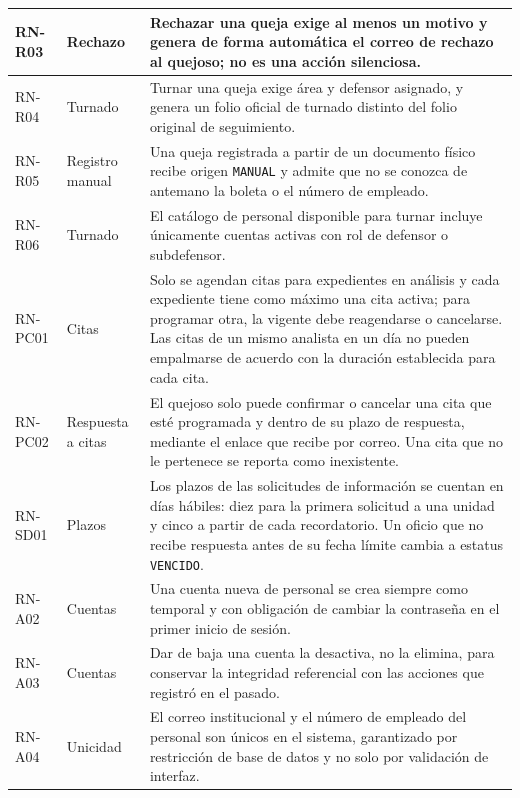 \begin{longtable}{|L{1.8cm}|L{2.7cm}|L{11.1cm}|}
	
		RN-R03 & Rechazo & Rechazar una queja exige al menos un motivo y genera de forma automática
		el correo de rechazo al quejoso; no es una acción silenciosa. \\ \hline
	
		RN-R04 & Turnado & Turnar una queja exige área y defensor asignado, y genera un folio oficial
		de turnado distinto del folio original de seguimiento. \\ \hline
	
		RN-R05 & Registro manual & Una queja registrada a partir de un documento físico recibe origen
		\texttt{MANUAL} y admite que no se conozca de antemano la boleta o el número de empleado.
		\\ \hline
	
		RN-R06 & Turnado & El catálogo de personal disponible para turnar incluye únicamente cuentas
		activas con rol de defensor o subdefensor. \\ \hline

		RN-PC01 & Citas & Solo se agendan citas para expedientes en análisis y cada expediente
		tiene como máximo una cita activa; para programar otra, la vigente debe reagendarse o
		cancelarse. Las citas de un mismo analista en un día no pueden empalmarse de acuerdo con la
		duración establecida para cada cita. \\ \hline

		RN-PC02 & Respuesta a citas & El quejoso solo puede confirmar o cancelar una cita que esté
		programada y dentro de su plazo de respuesta, mediante el enlace que recibe por correo. Una
		cita que no le pertenece se reporta como inexistente. \\ \hline

		RN-SD01 & Plazos & Los plazos de las solicitudes de información se cuentan en días hábiles:
		diez para la primera solicitud a una unidad y cinco a partir de cada recordatorio. Un oficio
		que no recibe respuesta antes de su fecha límite cambia a estatus \texttt{VENCIDO}. \\ \hline
	
	
	
		RN-A02 & Cuentas & Una cuenta nueva de personal se crea siempre como temporal y con
		obligación de cambiar la contraseña en el primer inicio de sesión. \\ \hline
	
		RN-A03 & Cuentas & Dar de baja una cuenta la desactiva, no la elimina, para conservar la
		integridad referencial con las acciones que registró en el pasado. \\ \hline
	
		RN-A04 & Unicidad & El correo institucional y el número de empleado del personal son únicos
		en el sistema, garantizado por restricción de base de datos y no solo por validación de
		interfaz. \\ \hline
	
	
	
	\end{longtable}
	
